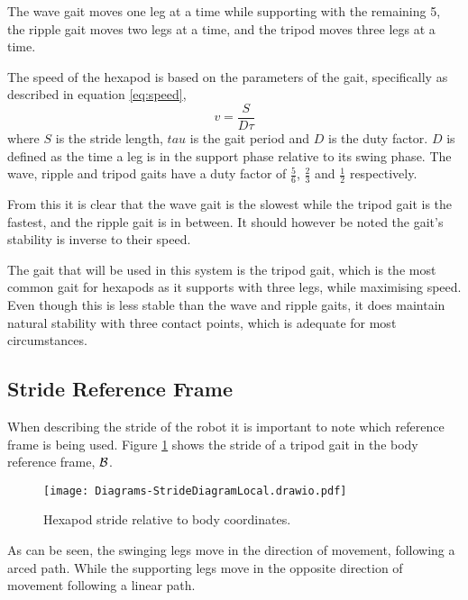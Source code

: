         \noindent
        The wave gait moves one leg at a time while supporting with the remaining 5, the ripple gait moves two legs at a time, and the tripod moves
        three legs at a time.

        The speed of the hexapod is based on the parameters of the gait, specifically as described in equation \ref{eq:speed},
        \begin{equation} \label{eq:speed}
            v = \frac{S}{D\tau}
        \end{equation}
        where \(S\) is the stride length, \(tau\) is the gait period and \(D\) is the duty factor. \(D\) is defined as the time a leg is in the support phase relative to its swing phase.
        The wave, ripple and tripod gaits have a duty factor of \(\frac{5}{6}\), \(\frac{2}{3}\) and \(\frac{1}{2}\) respectively.
        
        From this it is clear that the wave gait is the slowest while the tripod gait is the fastest, and the ripple gait is in between.
        It should however be noted the gait's stability is inverse to their speed.

        The gait that will be used in this system is the tripod gait, which is the most common gait for hexapods as it supports with three legs, while maximising speed. Even though this is less stable than
        the wave and ripple gaits, it does maintain natural stability with three contact points, which is adequate for most circumstances.

        \subsection{Stride Reference Frame}
            When describing the stride of the robot it is important to note which reference frame is being used. Figure \ref{fig:stride_body} shows
            the stride of a tripod gait in the body reference frame, \(\fbody\).
            \begin{figure}[h]
                \centering
                \texttt{[image: Diagrams-StrideDiagramLocal.drawio.pdf]}
                \caption{Hexapod stride relative to body coordinates.}
                \label{fig:stride_body}
            \end{figure}

            \noindent
            As can be seen, the swinging legs move in the direction of movement, following a arced path.
            While the supporting legs move in the opposite direction of movement following a linear path. 

